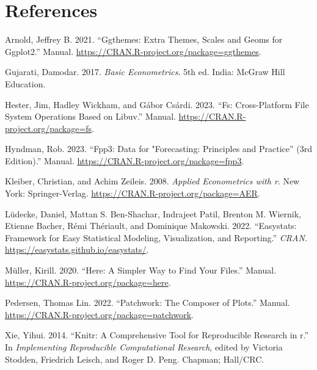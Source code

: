 \documentclass[
  letterpaper,
  paper =a4,
  twoside,
  openright,
  headsepline,
  footsepline,
  listof = totocnumbered,
  chapterprefix = true,
  firstiscover,
  parskip = full*]{scrbook}
\newlength{\cslhangindent}
\newenvironment{CSLReferences}[2] %
 {\begin{list}{}{%
  \setlength{\itemindent}{0pt}
  \setlength{\leftmargin}{0pt}
  \setlength{\parsep}{0pt}
  \ifodd #1
   \setlength{\leftmargin}{\cslhangindent}
   \setlength{\itemindent}{-1\cslhangindent}
  \fi
  \setlength{\itemsep}{#2\baselineskip}}}
 {\end{list}}
\begin{document}
\chapter*{References}\label{references}


\label{refs}
\begin{CSLReferences}{1}{0}
Arnold, Jeffrey B. 2021. {``Ggthemes: Extra Themes, Scales and Geoms for
Ggplot2.''} Manual. \url{https://CRAN.R-project.org/package=ggthemes}.

Gujarati, Damodar. 2017. \emph{Basic Econometrics}. 5th ed. India:
{McGraw} Hill Education.

Hester, Jim, Hadley Wickham, and Gábor Csárdi. 2023. {``Fs:
Cross-Platform File System Operations Based on Libuv.''} Manual.
\url{https://CRAN.R-project.org/package=fs}.

Hyndman, Rob. 2023. {``Fpp3: Data for "Forecasting: Principles and
Practice'' (3rd Edition).''} Manual.
\url{https://CRAN.R-project.org/package=fpp3}.

Kleiber, Christian, and Achim Zeileis. 2008. \emph{Applied Econometrics
with r}. New York: Springer-Verlag.
\url{https://CRAN.R-project.org/package=AER}.

Lüdecke, Daniel, Mattan S. Ben-Shachar, Indrajeet Patil, Brenton M.
Wiernik, Etienne Bacher, Rémi Thériault, and Dominique Makowski. 2022.
{``Easystats: Framework for Easy Statistical Modeling, Visualization,
and Reporting.''} \emph{{CRAN}}.
\url{https://easystats.github.io/easystats/}.

Müller, Kirill. 2020. {``Here: A Simpler Way to Find Your Files.''}
Manual. \url{https://CRAN.R-project.org/package=here}.

Pedersen, Thomas Lin. 2022. {``Patchwork: The Composer of Plots.''}
Manual. \url{https://CRAN.R-project.org/package=patchwork}.

Xie, Yihui. 2014. {``Knitr: A Comprehensive Tool for Reproducible
Research in r.''} In \emph{Implementing Reproducible Computational
Research}, edited by Victoria Stodden, Friedrich Leisch, and Roger D.
Peng. Chapman; Hall/{CRC}.


\end{CSLReferences}
\end{document}
